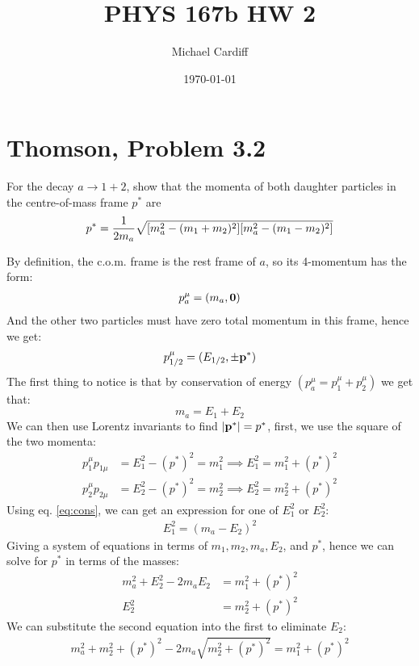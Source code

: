 \documentclass[12pt]{article}
\title{\vspace{-3em}PHYS 167b HW 2}
\author{Michael Cardiff}
\date{\today}
\begin{document}
\maketitle
\section{Thomson, Problem 3.2}
\begin{problem}
  For the decay $a\to1+2$, show that the momenta of both daughter particles in the centre-of-mass frame $p^*$ are
  \begin{equation*}
    p^*=\frac1{2m_a}\sqrt{\qty[m_a^2-(m_1+m_2)^2]\qty[m_a^2-(m_1-m_2)^2]}
  \end{equation*}
\end{problem}
By definition, the c.o.m. frame is the rest frame of $a$, so its 4-momentum has the form:
\begin{align*}
  p^\mu_a=(m_a,\vb{0})
\end{align*}
And the other two particles must have zero total momentum in this frame, hence we get:
\begin{align*}
  p_{1/2}^\mu=(E_{1/2},\pm\vb{p}^*)
\end{align*}
The first thing to notice is that by conservation of energy $(p^\mu_a=p_1^\mu+p_2^\mu)$ we get that:
\begin{equation}
  \label{eq:cons}
  m_a=E_1+E_2
\end{equation}
We can then use Lorentz invariants to find $\abs{\vb{p}^*}=p^*$, first, we use the square of the two momenta:
\begin{align*}
  p_1^\mu p_{1\mu}&=E_1^2-(p^*)^2=m_1^2\implies E_1^2=m_1^2+(p^*)^2\\
  p_2^\mu p_{2\mu}&=E_2^2-(p^*)^2=m_2^2\implies E_2^2=m_2^2+(p^*)^2
\end{align*}
Using eq. \eqref{eq:cons}, we can get an expression for one of $E_1^2$ or $E_2^2$:
\begin{align*}
  E_1^2=(m_a-E_2)^2
\end{align*}
Giving a system of equations in terms of $m_1,m_2,m_a,E_2$, and $p^*$, hence we can solve for $p^*$ in terms of the masses:
\begin{align*}
  m_a^2+E_2^2-2m_aE_2&=m_1^2+(p^*)^2\\
  E_2^2&=m_2^2+(p^*)^2
\end{align*}
We can substitute the second equation into the first to eliminate $E_2$:
\begin{align*}
  m_a^2+m_2^2+(p^*)^2-2m_a\sqrt{m_2^2+(p^*)^2}=m_1^2+(p^*)^2
\end{align*}
\end{document}
